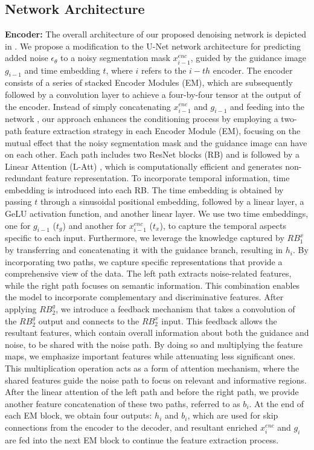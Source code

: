 \documentclass[runningheads]{llncs}
\begin{document}
\subsection{Network Architecture}
\noindent\textbf{Encoder:} The overall architecture of our proposed denoising network is depicted in . We propose a modification to the U-Net network architecture for predicting added noise $\epsilon_\theta$ to a noisy segmentation mask $x_{i-1}^{enc}$, guided by the guidance image $g_{i-1}$ and time embedding $t$, where $i$ refers to the $i-th$ encoder. The encoder consists of a series of stacked Encoder Modules (EM), which are subsequently followed by a convolution layer to achieve a four-by-four tensor at the output of the encoder. Instead of simply concatenating $x_{i-1}^{enc}$ and $g_{i-1}$ and feeding into the network \cite{wolleb2022diffusion}, our approach enhances the conditioning process by employing a two-path feature extraction strategy in each Encoder Module (EM), focusing on the mutual effect that the noisy segmentation mask and the guidance image can have on each other. Each path includes two ResNet blocks (RB) and is followed by a Linear Attention (L-Att) \cite{shen2021efficient}, which is computationally efficient and generates non-redundant feature representation. To incorporate temporal information, time embedding is introduced into each RB. The time embedding is obtained by passing $t$ through a sinusoidal positional embedding, followed by a linear layer, a GeLU activation function, and another linear layer. We use two time embeddings, one for $g_{i-1}$ ($t_g$) and another for $x_{i-1}^{enc}$ ($t_x$), to capture the temporal aspects specific to each input. Furthermore, we leverage the knowledge captured by $RB_1^x$ by transferring and concatenating it with the guidance branch, resulting in $h_{i}$. By incorporating two paths, we capture specific representations that provide a comprehensive view of the data. The left path extracts noise-related features, while the right path focuses on semantic information. This combination enables the model to incorporate complementary and discriminative features. After applying $RB_{2}^g$, we introduce a feedback mechanism that takes a convolution of the $RB_{2}^g$ output and connects to the $RB_{2}^x$ input. This feedback allows the resultant features, which contain overall information about both the guidance and noise, to be shared with the noise path. By doing so and multiplying the feature maps, we emphasize important features while attenuating less significant ones. This multiplication operation acts as a form of attention mechanism, where the shared features guide the noise path to focus on relevant and informative regions. After the linear attention of the left path and before the right path, we provide another feature concatenation of these two paths, referred to as $b_{i}$. At the end of each EM block, we obtain four outputs: $h_{i}$ and $b_{i}$, which are used for skip connections from the encoder to the decoder, and resultant enriched $x_{i}^{enc}$ and $g_{i}$ are fed into the next EM block to continue the feature extraction process.
\end{document}
